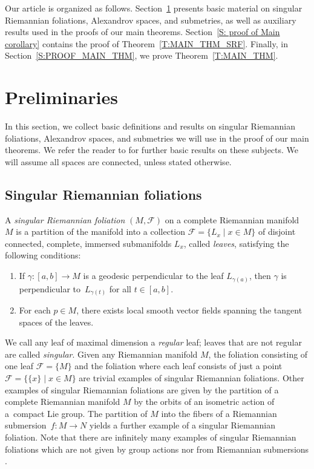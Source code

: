 \documentclass[10pt,a4paper]{amsart}
\numberwithin{equation}{section}
\theoremstyle{definition}
\newcommand{\fol}{\mathcal{F}}
\begin{document}
	
Our article is organized as follows. Section~\ref{S:PRELIMINARIES} presents basic material on singular Riemannian foliations, Alexandrov spaces, and submetries, as well as auxiliary results used in the proofs of our main theorems. Section~\ref{S: proof of Main corollary} contains the proof of Theorem~\ref{T:MAIN_THM_SRF}. Finally, in Section~\ref{S:PROOF_MAIN_THM}, we prove Theorem~\ref{T:MAIN_THM}.



\section{Preliminaries}
\label{S:PRELIMINARIES}

In this section, we collect basic definitions and results on singular Riemannian foliations, Alexandrov spaces, and submetries we will use in the proof of our main theorems. We refer the reader to \cite{AlexandrinoBriquetToeben2013,BuragoBuragoIvanov,GromollWalschap2009,KapovitchLytchak2022,Lytchak} for further basic results on these subjects. We will assume all spaces are connected, unless stated otherwise.


\subsection{Singular Riemannian foliations}
\label{S: Singular Riemannian foliations}
A \emph{singular Riemannian foliation} $(M,\fol)$ on a complete Riemannian manifold $M$ is a partition of the manifold into a collection $\fol = \{L_x\mid x\in M\}$ of disjoint connected, complete, immersed submanifolds $L_x$, called \emph{leaves}, satisfying the following conditions:
\begin{enumerate}\itemsep=0pt
\item[(i)] If $\gamma\colon [a,b] \to M$ is a geodesic perpendicular to the leaf $L_{\gamma(a)}$, then $\gamma$ is perpendicular to~$L_{\gamma(t)}$ for all $t\in [a,b]$.
\item[(ii)] For each $p\in M$, there exists local smooth vector fields spanning the tangent spaces of the leaves.	
\end{enumerate}

We call any leaf of maximal dimension a \emph{regular} leaf; leaves that are not regular are called \emph{singular}. Given any Riemannian manifold $M$, the foliation consisting of one leaf $\fol = \{M\}$ and the foliation where each leaf consists of just a point $\fol = \{\{x\}\mid x\in M\}$ are trivial examples of singular Riemannian foliations.
Other examples of singular Riemannian foliations are given by the partition of a complete Riemannian manifold $M$ by the orbits of an isometric action of a~compact Lie group. The partition of $M$ into the fibers of a Riemannian submersion~${f\colon M\to N}$ yields a further example of a singular Riemannian foliation. Note that there are infinitely many examples of singular Riemannian foliations which are not given by group actions nor from Riemannian submersions \cite{FerusKarcherMuenzner1981,Radeschi2014}.
	
\end{document}

